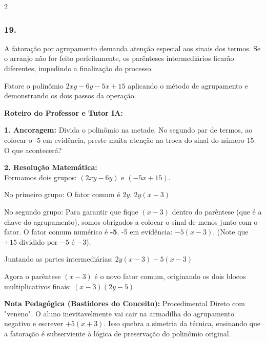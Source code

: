 \begin{multicols*}{2}
\subsubsection*{19.} 
\begin{enunciadoLiteral}
A fatoração por agrupamento demanda atenção especial aos sinais dos termos. Se o arranjo não for feito perfeitamente, os parênteses intermediários ficarão diferentes, impedindo a finalização do processo. 

Fatore o polinômio $ 2xy - 6y - 5x + 15 $ aplicando o método de agrupamento e demonstrando os dois passos da operação.
\end{enunciadoLiteral}

\ifgabarito
    \begin{tcolorbox}[colback=CorTitUm!5, colframe=CorTitUm, boxrule=1pt, arc=4pt, left=6pt, right=6pt, top=6pt, bottom=6pt]
    \small\textbf{\textcolor{CorTitUm}{Roteiro do Professor e Tutor IA:}}\par\vspace{0.1cm}
    \color{CinzaEscuro}
    \textbf{1. Ancoragem:} Divida o polinômio na metade. No segundo par de termos, ao colocar o -5 em evidência, preste muita atenção na troca do sinal do número 15. O que acontecerá?\par\vspace{0.1cm}
    \textbf{2. Resolução Matemática:}\\
    Formamos dois grupos: $ (2xy - 6y) $ e $ (- 5x + 15) $.
    
    No primeiro grupo: O fator comum é $ 2y $.
    $ 2y(x - 3) $
    
    No segundo grupo: Para garantir que fique $ (x - 3) $ dentro do parêntese (que é a chave do agrupamento), somos obrigados a colocar o sinal de menos junto com o fator. O fator comum numérico é \textbf{-5}.
    -5 em evidência: $ -5(x - 3) $. (Note que $+15$ dividido por $-5$ é $-3$).
    
    Juntando as partes intermediárias:
    $ 2y(x - 3) - 5(x - 3) $
    
    Agora o parêntese $ (x - 3) $ é o novo fator comum, originando os dois blocos multiplicativos finais:
    $ (x - 3)(2y - 5) $
    \end{tcolorbox}
    \vspace{0.15cm}
    
    \begin{boxexplicacao}
    \textbf{Nota Pedagógica (Bastidores do Conceito):} Procedimental Direto com "veneno". O aluno inevitavelmente vai cair na armadilha do agrupamento negativo e escrever $+5(x + 3)$. Isso quebra a simetria da técnica, ensinando que a fatoração é subserviente à lógica de preservação do polinômio original.
    \end{boxexplicacao}
\fi


\end{multicols*}
